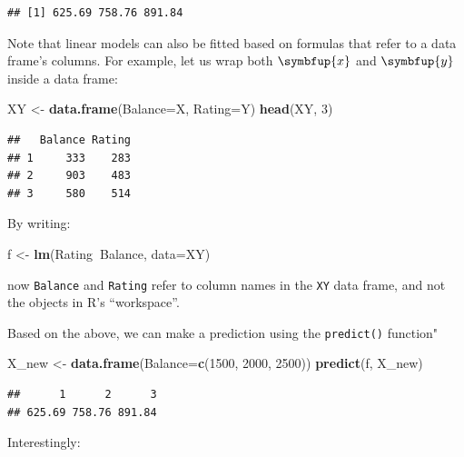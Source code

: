 \documentclass[10pt,b5paper,krantz1]{krantz}
\newenvironment{Shaded}{\begin{snugshade}}{\end{snugshade}}
\newcommand{\DataTypeTok}[1]{\textcolor[rgb]{0.27,0.27,0.27}{#1}}
\newcommand{\DecValTok}[1]{\textcolor[rgb]{0.06,0.06,0.06}{#1}}
\newcommand{\KeywordTok}[1]{\textcolor[rgb]{0.27,0.27,0.27}{\textbf{#1}}}
\newcommand{\NormalTok}[1]{#1}
\newcommand{\OperatorTok}[1]{\textcolor[rgb]{0.43,0.43,0.43}{\textbf{#1}}}
\newcommand{\StringTok}[1]{\textcolor[rgb]{0.5,0.5,0.5}{#1}}
\renewcommand{\mathbf}[1]{\symbfup{#1}}
\begin{document}
\begin{verbatim}
## [1] 625.69 758.76 891.84
\end{verbatim}

Note that linear models can also be fitted based on formulas that refer
to a data frame's columns. For example, let us wrap
both \(\mathbf{x}\) and \(\mathbf{y}\) inside a data frame:

\begin{Shaded}
\begin{Highlighting}[]
\NormalTok{XY <-}\StringTok{ }\KeywordTok{data.frame}\NormalTok{(}\DataTypeTok{Balance=}\NormalTok{X, }\DataTypeTok{Rating=}\NormalTok{Y)}
\KeywordTok{head}\NormalTok{(XY, }\DecValTok{3}\NormalTok{)}
\end{Highlighting}
\end{Shaded}

\begin{verbatim}
##   Balance Rating
## 1     333    283
## 2     903    483
## 3     580    514
\end{verbatim}

By writing:

\begin{Shaded}
\begin{Highlighting}[]
\NormalTok{f <-}\StringTok{ }\KeywordTok{lm}\NormalTok{(Rating}\OperatorTok{~}\NormalTok{Balance, }\DataTypeTok{data=}\NormalTok{XY)}
\end{Highlighting}
\end{Shaded}

now \texttt{Balance} and \texttt{Rating} refer to column names in the \texttt{XY} data frame,
and not the objects in R's ``workspace''.

Based on the above, we can make a prediction
using the \texttt{predict()} function"

\begin{Shaded}
\begin{Highlighting}[]
\NormalTok{X_new <-}\StringTok{ }\KeywordTok{data.frame}\NormalTok{(}\DataTypeTok{Balance=}\KeywordTok{c}\NormalTok{(}\DecValTok{1500}\NormalTok{, }\DecValTok{2000}\NormalTok{, }\DecValTok{2500}\NormalTok{))}
\KeywordTok{predict}\NormalTok{(f, X_new)}
\end{Highlighting}
\end{Shaded}

\begin{verbatim}
##      1      2      3 
## 625.69 758.76 891.84
\end{verbatim}

Interestingly:
\end{document}
